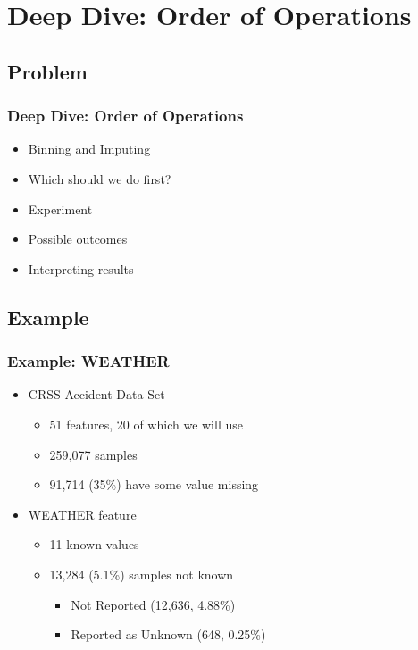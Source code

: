 \section{Deep Dive:  Order of Operations}

\subsection{Problem}
\begin{frame}[t]
	\frametitle{Deep Dive:  Order of Operations}
\Large

	\begin{itemize}
		\item Binning and Imputing
		\item Which should we do first?		
		\item Experiment
		\item Possible outcomes
		\item Interpreting results
	\end{itemize}
	
\end{frame}

\subsection{Example}
\begin{frame}[t]
	\frametitle{Example:  WEATHER}
\Large

	\begin{itemize}
		\item CRSS Accident Data Set
		
		\begin{itemize}
			\Large
			\item 51 features, 20 of which we will use
			\item 259,077 samples
			\item 91,714 (35\%) have some value missing
		\end{itemize}
		
		\item WEATHER feature
		
		\begin{itemize}
			\Large
			\item 11 known values	
			
			\vskip 6pt
			\item 13,284 (5.1\%) samples not known
			\begin{itemize}
				\Large
				\item Not Reported (12,636, 4.88\%)
				\item Reported as Unknown (648, 0.25\%)
			\end{itemize}
		\end{itemize}
	\end{itemize}
	
\end{frame}

